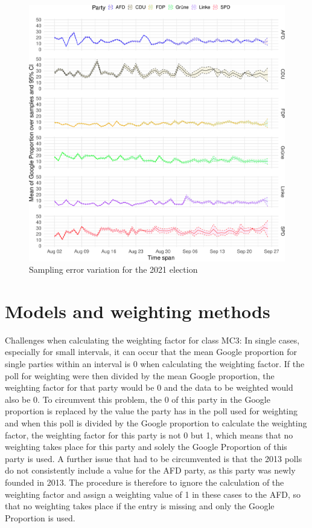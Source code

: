 \documentclass[
  letterpaper,
  DIV=11,
  numbers=noendperiod]{scrartcl}
\begin{document}
\begin{figure}[H]

\caption{\label{fig-A3}Sampling error variation for the 2021 election}

{\centering \includegraphics{figures/fig-A3-1.pdf}

}

\end{figure}

\hypertarget{models-and-weighting-methods}{%
\section{Models and weighting
methods}\label{models-and-weighting-methods}}

Challenges when calculating the weighting factor for class MC3: In
single cases, especially for small intervals, it can occur that the mean
Google proportion for single parties within an interval is 0 when
calculating the weighting factor. If the poll for weighting were then
divided by the mean Google proportion, the weighting factor for that
party would be 0 and the data to be weighted would also be 0. To
circumvent this problem, the 0 of this party in the Google proportion is
replaced by the value the party has in the poll used for weighting and
when this poll is divided by the Google proportion to calculate the
weighting factor, the weighting factor for this party is not 0 but 1,
which means that no weighting takes place for this party and solely the
Google Proportion of this party is used. A further issue that had to be
circumvented is that the 2013 polls do not consistently include a value
for the AFD party, as this party was newly founded in 2013. The
procedure is therefore to ignore the calculation of the weighting factor
and assign a weighting value of 1 in these cases to the AFD, so that no
weighting takes place if the entry is missing and only the Google
Proportion is used.
\end{document}
